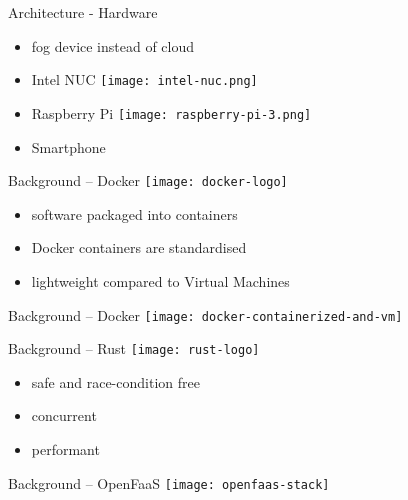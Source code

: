 \documentclass[aspectratio=1610]{beamer}
\begin{document}
  \begin{frame}{Architecture - Hardware}
    \begin{itemize}
      \item fog device instead of cloud
      \item Intel NUC
            \hspace*{13.5em}
            \texttt{[image: intel-nuc.png]}
      \item Raspberry Pi
            \hspace*{13.5em}
            \texttt{[image: raspberry-pi-3.png]}
      \item Smartphone
    \end{itemize}
  \end{frame}

  \begin{frame}{Background -- Docker}
    \texttt{[image: docker-logo]}

    \vspace*{1.5em}

    \begin{itemize}
      \item software packaged into containers
      \item Docker containers are standardised
      \item lightweight compared to Virtual Machines
    \end{itemize}
  \end{frame}

  \begin{frame}{Background -- Docker}
    \vfill
    \texttt{[image: docker-containerized-and-vm]}
  \end{frame}

  \begin{frame}{Background -- Rust}
    \texttt{[image: rust-logo]}

    \vspace*{1.5em}

    \begin{itemize}
      \item safe and race-condition free
      \item concurrent
      \item performant
    \end{itemize}
  \end{frame}

  \begin{frame}{Background -- OpenFaaS}
    \texttt{[image: openfaas-stack]}
  \end{frame}
\end{document}
